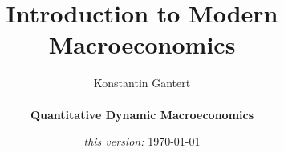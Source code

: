 \documentclass[10pt,c,aspectratio=1610,handout]{beamer}
\begin{document}
\title{Introduction to Modern Macroeconomics}
\author[Konstantin Gantert]{\begin{large} Konstantin Gantert \end{large} \\ \textbf{Quantitative Dynamic Macroeconomics}}
\date{\textit{this version:} \today}

\beamertemplatenavigationsymbolsempty

{ 
\frame{\titlepage}}
 \addtocounter{framenumber}{-1}
\end{document}
